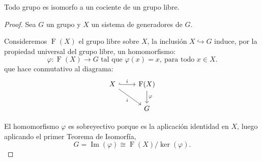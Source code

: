 %
%









\newpage
\begin{theorem}\label{coli}
Todo grupo es isomorfo a un cociente de un grupo libre.
\end{theorem}

\begin{proof}
Sea $G$ un grupo y $X$ un sistema de generadores de $G$.


Consideremos $\operatorname{F}(X)$ el grupo libre sobre $X$, la inclusión $X\hookrightarrow G$ induce, por la propiedad universal del grupo libre, un homomorfismo:
\[
    \varphi \colon \operatorname{F}(X) \rightarrow G \text{ tal que }  \varphi(x)=x, \:  \text{para todo } x \in X. 
\]
que hace conmutativo al diagrama:
\[
\begin{tikzcd}
 X \arrow[r,hook]{}{i} \arrow[dr,']{}{i} & \operatorname{F}(X) \arrow[d]{}{\varphi}\\
& G
\end{tikzcd}
\]

El homomorfismo $\varphi$ es sobreyectivo porque es la aplicación identidad en $X$, luego aplicando el primer Teorema de Isomorfía,
\[
    G = \operatorname{Im}(\varphi) \cong \operatorname{F}(X)/\operatorname{ker}(\varphi). %
\]
\end{proof}


